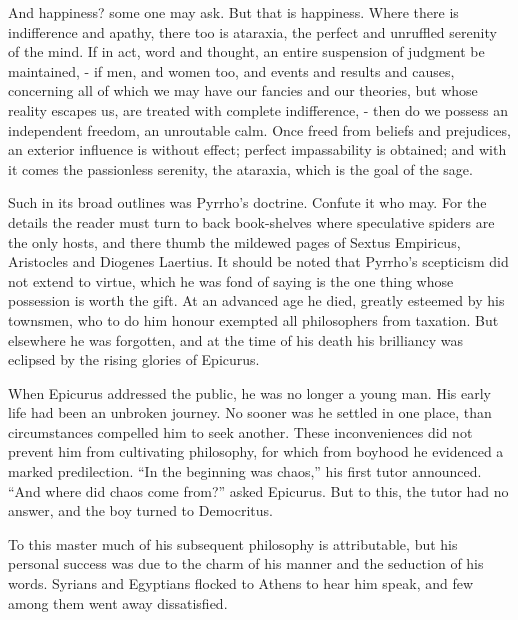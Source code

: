 \documentclass[]{book}
\begin{document}
And happiness? some one may ask. But that is happiness. Where there is
indifference and apathy, there too is ataraxia, the perfect and
unruffled serenity of the mind. If in act, word and thought, an entire
suspension of judgment be maintained, - if men, and women too, and
events and results and causes, concerning all of which we may have our
fancies and our theories, but whose reality escapes us, are treated with
complete indifference, - then do we possess an independent freedom, an
unroutable calm. Once freed from beliefs and prejudices, an exterior
influence is without effect; perfect impassability is obtained; and with
it comes the passionless serenity, the ataraxia, which is the goal of
the sage.

Such in its broad outlines was Pyrrho's doctrine. Confute it who may.
For the details the reader must turn to back book-shelves where
speculative spiders are the only hosts, and there thumb the mildewed
pages of Sextus Empiricus, Aristocles and Diogenes Laertius. It should
be noted that Pyrrho's scepticism did not extend to virtue, which he was
fond of saying is the one thing whose possession is worth the gift. At
an advanced age he died, greatly esteemed by his townsmen, who to do him
honour exempted all philosophers from taxation. But elsewhere he was
forgotten, and at the time of his death his brilliancy was eclipsed by
the rising glories of Epicurus.

When Epicurus addressed the public, he was no longer a young man. His
early life had been an unbroken journey. No sooner was he settled in one
place, than circumstances compelled him to seek another. These
inconveniences did not prevent him from cultivating philosophy, for
which from boyhood he evidenced a marked predilection. ``In the
beginning was chaos,'' his first tutor announced. ``And where did chaos
come from?'' asked Epicurus. But to this, the tutor had no answer, and
the boy turned to Democritus.

To this master much of his subsequent philosophy is attributable, but
his personal success was due to the charm of his manner and the
seduction of his words. Syrians and Egyptians flocked to Athens to hear
him speak, and few among them went away dissatisfied.
\end{document}
